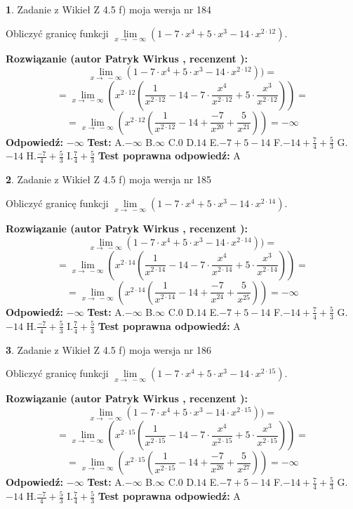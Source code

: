 \documentclass[12pt, a4paper]{article}
\theoremstyle{definition} %
\newtheorem{zad}{}
\newcommand{\zadStart}[1]{\begin{zad}#1\newline}
\newcommand{\zadStop}{\end{zad}}
\newcommand{\rozwStart}[2]{\noindent \textbf{Rozwiązanie (autor #1 , recenzent #2): }\newline}
\newcommand{\rozwStop}{\newline}
\newcommand{\odpStart}{\noindent \textbf{Odpowiedź:}\newline}
\newcommand{\odpStop}{\newline}
\newcommand{\testStart}{\noindent \textbf{Test:}\newline}
\newcommand{\testStop}{\newline}
\newcommand{\kluczStart}{\noindent \textbf{Test poprawna odpowiedź:}\newline}
\newcommand{\kluczStop}{\newline}
\begin{document}
\zadStart{Zadanie z Wikieł Z 4.5 f) moja wersja nr 184}



Obliczyć granicę funkcji  $\lim\limits_{x\to\ -\infty}(1 - 7 \cdot x^{4}+5 \cdot x^{3}- 14 \cdot x^{2\cdot12})$.
\zadStop
\rozwStart{Patryk Wirkus}{}
$$\lim\limits_{x\to\ -\infty}(1 - 7 \cdot x^{4}+5 \cdot x^{3}- 14 \cdot x^{2\cdot12}))=$$
$$=\lim\limits_{x\to\ -\infty}(x^{2\cdot12}(\frac{1}{x^{2\cdot12}}-14 -7 \cdot \frac{x^{4}}{x^{2\cdot12}}+5 \cdot \frac{x^{3}}{x^{2\cdot12}}))=$$
$$=\lim\limits_{x\to\ -\infty}(x^{2\cdot12}(\frac{1}{x^{2\cdot12}}-14 + \frac{-7}{x^{20}}+ \frac{5}{x^{21}}))=-\infty$$
\rozwStop
\odpStart
$-\infty$
\odpStop
\testStart
A.$-\infty$ B.$\infty$ C.$0$ D.$14$ E.$-7 + 5 - 14$
F.$-14+\frac{7}{4}+\frac{5}{3}$ G.$-14$
H.$\frac{-7}{4}+\frac{5}{3}$
I.$\frac{7}{4}+\frac{5}{3}$
\testStop
\kluczStart
A
\kluczStop



\zadStart{Zadanie z Wikieł Z 4.5 f) moja wersja nr 185}



Obliczyć granicę funkcji  $\lim\limits_{x\to\ -\infty}(1 - 7 \cdot x^{4}+5 \cdot x^{3}- 14 \cdot x^{2\cdot14})$.
\zadStop
\rozwStart{Patryk Wirkus}{}
$$\lim\limits_{x\to\ -\infty}(1 - 7 \cdot x^{4}+5 \cdot x^{3}- 14 \cdot x^{2\cdot14}))=$$
$$=\lim\limits_{x\to\ -\infty}(x^{2\cdot14}(\frac{1}{x^{2\cdot14}}-14 -7 \cdot \frac{x^{4}}{x^{2\cdot14}}+5 \cdot \frac{x^{3}}{x^{2\cdot14}}))=$$
$$=\lim\limits_{x\to\ -\infty}(x^{2\cdot14}(\frac{1}{x^{2\cdot14}}-14 + \frac{-7}{x^{24}}+ \frac{5}{x^{25}}))=-\infty$$
\rozwStop
\odpStart
$-\infty$
\odpStop
\testStart
A.$-\infty$ B.$\infty$ C.$0$ D.$14$ E.$-7 + 5 - 14$
F.$-14+\frac{7}{4}+\frac{5}{3}$ G.$-14$
H.$\frac{-7}{4}+\frac{5}{3}$
I.$\frac{7}{4}+\frac{5}{3}$
\testStop
\kluczStart
A
\kluczStop



\zadStart{Zadanie z Wikieł Z 4.5 f) moja wersja nr 186}



Obliczyć granicę funkcji  $\lim\limits_{x\to\ -\infty}(1 - 7 \cdot x^{4}+5 \cdot x^{3}- 14 \cdot x^{2\cdot15})$.
\zadStop
\rozwStart{Patryk Wirkus}{}
$$\lim\limits_{x\to\ -\infty}(1 - 7 \cdot x^{4}+5 \cdot x^{3}- 14 \cdot x^{2\cdot15}))=$$
$$=\lim\limits_{x\to\ -\infty}(x^{2\cdot15}(\frac{1}{x^{2\cdot15}}-14 -7 \cdot \frac{x^{4}}{x^{2\cdot15}}+5 \cdot \frac{x^{3}}{x^{2\cdot15}}))=$$
$$=\lim\limits_{x\to\ -\infty}(x^{2\cdot15}(\frac{1}{x^{2\cdot15}}-14 + \frac{-7}{x^{26}}+ \frac{5}{x^{27}}))=-\infty$$
\rozwStop
\odpStart
$-\infty$
\odpStop
\testStart
A.$-\infty$ B.$\infty$ C.$0$ D.$14$ E.$-7 + 5 - 14$
F.$-14+\frac{7}{4}+\frac{5}{3}$ G.$-14$
H.$\frac{-7}{4}+\frac{5}{3}$
I.$\frac{7}{4}+\frac{5}{3}$
\testStop
\kluczStart
A
\kluczStop
\end{document}
